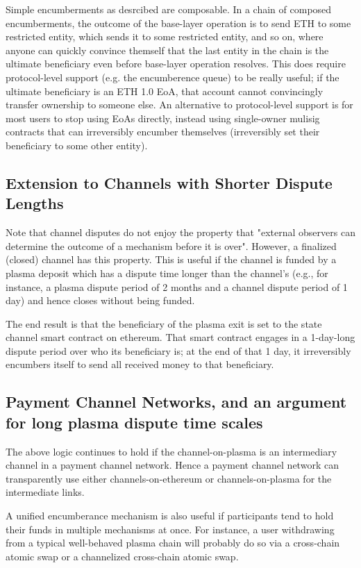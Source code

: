 \documentclass{article}
\begin{document}
Simple encumberments as desrcibed are composable. In a chain of composed encumberments, the outcome of the base-layer operation is to send ETH to some restricted entity, which sends it to some restricted entity, and so on, where anyone can quickly convince themself that the last entity in the chain is the ultimate beneficiary even before base-layer operation resolves. This does require protocol-level support (e.g. the encumberence queue) to be really useful; if the ultimate beneficiary is an ETH 1.0 EoA, that account cannot convincingly transfer ownership to someone else. An alternative to protocol-level support is for most users to stop using EoAs directly, instead using single-owner mulisig contracts that can irreversibly encumber themselves (irreversibly set their beneficiary to some other entity).

\subsection*{Extension to Channels with Shorter Dispute Lengths}

Note that channel disputes do not enjoy the property that "external observers can determine the outcome of a mechanism before it is over". However, a finalized (closed) channel has this property. This is useful if the channel is funded by a plasma deposit which has a dispute time longer than the channel's (e.g., for instance, a plasma dispute period of 2 months and a channel dispute period of 1 day) and hence closes without being funded.

The end result is that the beneficiary of the plasma exit is set to the state channel smart contract on ethereum. That smart contract engages in a 1-day-long dispute period over who its beneficiary is; at the end of that 1 day, it irreversibly encumbers itself to send all received money to that beneficiary.

\subsection*{Payment Channel Networks, and an argument for long plasma dispute time scales}

The above logic continues to hold if the channel-on-plasma is an intermediary channel in a payment channel network. Hence a payment channel network can transparently use either channels-on-ethereum or channels-on-plasma for the intermediate links.

A unified encumberance mechanism is also useful if participants tend to hold their funds in multiple mechanisms at once. For instance, a user withdrawing from a typical well-behaved plasma chain will probably do so via a cross-chain atomic swap or a channelized cross-chain atomic swap.
\end{document}
